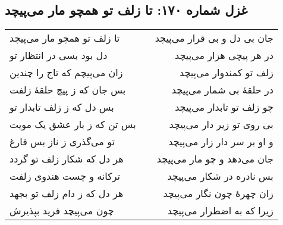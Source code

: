 \begin{center}
\section*{غزل شماره ۱۷۰: تا زلف تو همچو مار می‌پیچد}
\label{sec:170}
\begin{longtable}{l p{0.5cm} r}
تا زلف تو همچو مار می‌پیچد
&&
جان بی دل و بی قرار می‌پیچد
\\
دل بود بسی در انتظار تو
&&
در هر پیچی هزار می‌پیچد
\\
زان می‌پیچم که تاج را چندین
&&
زلف تو کمندوار می‌پیچد
\\
بس جان که ز پیچ حلقهٔ زلفت
&&
در حلقهٔ بی شمار می‌پیچد
\\
بس دل که ز زلف تابدار تو
&&
چو زلف تو تابدار می‌پیچد
\\
بس تن که ز بار عشق یک مویت
&&
بی روی تو زیر دار می‌پیچد
\\
تو می‌گذری ز ناز بس فارغ
&&
و او بر سر دار زار می‌پیچد
\\
هر دل که شکار زلف تو گردد
&&
جان می‌دهد و چو مار می‌پیچد
\\
ترکانه و چست هندوی زلفت
&&
بس نادره در شکار می‌پیچد
\\
هر دل که ز دام زلف تو بجهد
&&
زان چهرهٔ چون نگار می‌پیچد
\\
چون می‌پیچد فرید بپذیرش
&&
زیرا که به اضطرار می‌پیچد
\\
\end{longtable}
\end{center}
